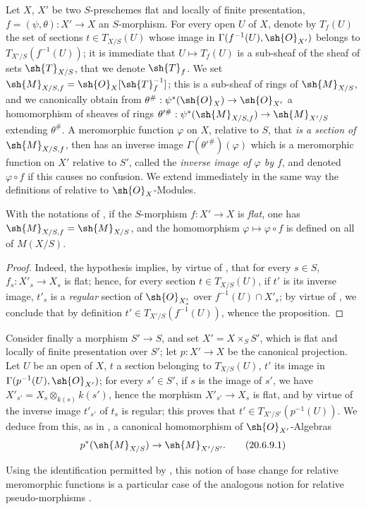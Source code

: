 \begin{env}[20.6.7]
\label{IV.20.6.7}
Let $X$, $X'$ be two $S$-preschemes flat and locally of finite presentation, $f=(\psi,\theta):X'\to X$ an $S$-morphism.
For every open $U$ of $X$, denote by $T_f(U)$ the set of sections $t\in T_{X/S}(U)$ whose image in $\Gamma(f^{-1}(U),\sh{O}_{X'})$ belongs to $T_{X'/S}(f^{-1}(U))$;
it is immediate that $U\mapsto T_f(U)$ is a sub-sheaf of the sheaf of sets $\sh{T}_{X/S}$, that we denote $\sh{T}_f$.
We set $\sh{M}_{X/S,f}=\sh{O}_X[\sh{T}_f^{-1}]$;
this is a sub-sheaf of rings of $\sh{M}_{X/S}$, and we canonically obtain from $\theta^\#:\psi^*(\sh{O}_X)\to\sh{O}_{X'}$ a homomorphism of sheaves of rings $\theta'^{\#}:\psi^*(\sh{M}_{X/S,f})\to\sh{M}_{X'/S}$ extending $\theta^\#$.
A meromorphic function $\varphi$ on $X$, relative to $S$, that \emph{is a section of $\sh{M}_{X/S,f}$}, then has an inverse image $\Gamma(\theta'^{\#})(\varphi)$ which is a meromorphic function on $X'$ relative to $S'$, called the \emph{inverse image of $\varphi$ by $f$}, and denoted $\varphi\circ f$ if this causes no confusion.
We extend immediately in the same way the definitions of  relative to $\sh{O}_X$-Modules.
\end{env}

\begin{proposition}[20.6.8]
\label{IV.20.6.8}
With the notations of , if the $S$-morphism $f:X'\to X$ is \emph{flat}, one has $\sh{M}_{X/S,f}=\sh{M}_{X/S}$, and the homomorphism $\varphi\mapsto\varphi\circ f$ is defined on all of $M(X/S)$.
\end{proposition}

\begin{proof}
Indeed, the hypothesis implies, by virtue of , that for every $s\in S$, $f_s:X'_s\to X_s$ is flat;
hence, for every section $t\in T_{X/S}(U)$, if $t'$ is its inverse image, $t'_s$ is a \emph{regular} section of $\sh{O}_{X'_s}$ over $f^{-1}(U)\cap X'_s$;
by virtue of , we conclude that by definition $t'\in T_{X'/S}(f^{-1}(U))$, whence the proposition.
\end{proof}

\begin{env}[20.6.9]
\label{IV.20.6.9}
Consider finally a morphism $S'\to S$, and set $X'=X\times_S S'$, which is flat and locally of finite presentation over $S'$;
let $p:X'\to X$ be the canonical projection.
Let $U$ be an open of $X$, $t$ a section belonging to $T_{X/S}(U)$, $t'$ its image in $\Gamma(p^{-1}(U),\sh{O}_{X'})$;
for every $s'\in S'$, if $s$ is the image of $s'$, we have $X'_{s'}=X_s\otimes_{k(s)}k(s')$, hence the morphism $X'_{s'}\to X_s$ is flat, and by virtue of  the inverse image $t'_{s'}$ of $t_s$ is regular;
this proves that $t'\in T_{X'/S'}(p^{-1}(U))$.
We deduce from this, as in , a canonical homomorphism of $\sh{O}_{X'}$-Algebras
\[
\label{IV.20.6.9.1}
  p^*(\sh{M}_{X/S})\to\sh{M}_{X'/S'}.
  \tag{20.6.9.1}
\]

Using the identification permitted by , this notion of base change for relative meromorphic functions is a particular case of the analogous notion for relative pseudo-morphisms .
\end{env}

